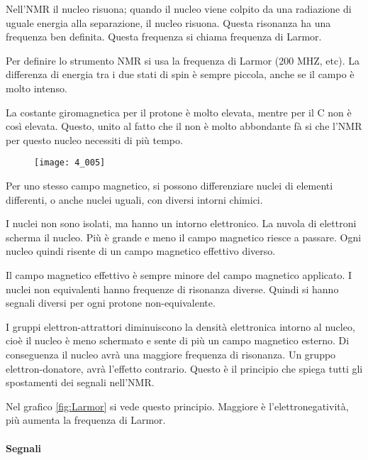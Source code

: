 Nell'NMR il nucleo risuona; quando il nucleo viene colpito da una radiazione di uguale energia alla separazione, il nucleo risuona. Questa
risonanza ha una frequenza ben definita. Questa frequenza si chiama frequenza di Larmor.

Per definire lo strumento NMR si usa la frequenza di Larmor (200 MHZ, etc).
La differenza di energia tra i due stati di spin è sempre piccola, anche se il campo è molto intenso.

La costante giromagnetica per il protone è molto elevata, mentre per il C non
è così elevata. Questo, unito al fatto che il  non è molto abbondante fà si che l'NMR per questo nucleo necessiti di più tempo.

\begin{figure}[H]
  \texttt{[image: 4\_005]}
\end{figure}


Per uno stesso campo magnetico, si possono  differenziare nuclei di elementi differenti, o anche nuclei uguali, con diversi intorni chimici.

I nuclei non sono isolati, ma hanno un intorno elettronico. La nuvola di
elettroni scherma il nucleo. Più è grande e meno il campo magnetico
riesce a passare.
Ogni nucleo quindi risente di un campo magnetico effettivo diverso.

Il campo magnetico effettivo è sempre minore del campo magnetico
applicato. I nuclei non equivalenti hanno frequenze di risonanza
diverse. Quindi si hanno segnali diversi per ogni protone non-equivalente.

I gruppi elettron-attrattori diminuiscono la densità elettronica intorno
al nucleo, cioè il nucleo è meno schermato e sente di più un campo
magnetico esterno. Di conseguenza il nucleo avrà una maggiore frequenza
di risonanza.
Un gruppo elettron-donatore, avrà l'effetto contrario.
Questo è il principio che spiega tutti gli spostamenti dei segnali nell'NMR.


Nel grafico \ref{fig:Larmor} si vede questo principio. Maggiore è
l'elettronegatività, più aumenta la frequenza di Larmor.

\paragraph{Segnali}

